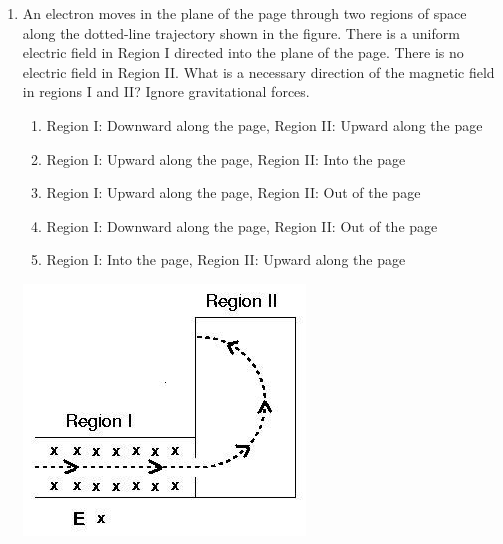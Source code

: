 ﻿\documentclass[12pt, a4paper]{article}
\begin{document}
\begin{CJK*}{UTF8}{gbsn}
\begin{enumerate}[itemsep=1.0em, topsep=0.6em]
\item \label{prob:8}
\noindent\begin{minipage}[t]{0.55\linewidth}
\vspace{0pt}
An electron moves in the plane of the page through two regions of space along the dotted-line trajectory shown in the figure. There is a uniform electric field in Region I directed into the plane of the page. There is no electric field in Region II. What is a necessary direction of the magnetic field in regions I and II? Ignore gravitational forces.
\begin{enumerate}[label=(\Alph*)]
    \item Region I: Downward along the page, Region II: Upward along the page
    \item Region I: Upward along the page, Region II: Into the page
    \item Region I: Upward along the page, Region II: Out of the page
    \item Region I: Downward along the page, Region II: Out of the page
    \item Region I: Into the page, Region II: Upward along the page
\end{enumerate}
\end{minipage}%
\hfill
\begin{minipage}[t]{0.4\linewidth}
\vspace{0pt}
\centering
\includegraphics[width=\linewidth]{Problem_08_Figure.png}
\end{minipage}


\end{enumerate}
\end{CJK*}
\end{document}
